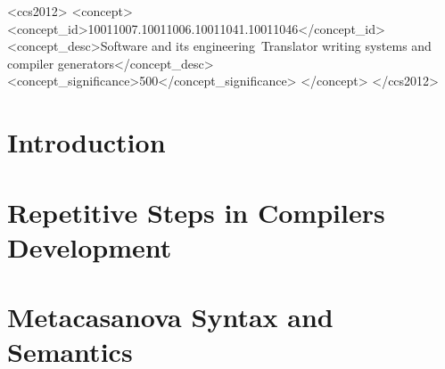 \documentclass[sigplan,screen]{acmart}%
\begin{document}
\begin{CCSXML}
 \begin{CCSXML}
	<ccs2012>
	<concept>
	<concept_id>10011007.10011006.10011041.10011046</concept_id>
	<concept_desc>Software and its engineering~Translator writing systems and compiler generators</concept_desc>
	<concept_significance>500</concept_significance>
	</concept>
	</ccs2012>
\end{CCSXML}



\maketitle

\section{Introduction}
\label{sec:introduction}


\section{Repetitive Steps in Compilers Development}
\label{sec:problem}


\section{Metacasanova Syntax and Semantics}
\label{sec:semantics}



\end{CCSXML}
\end{document}
